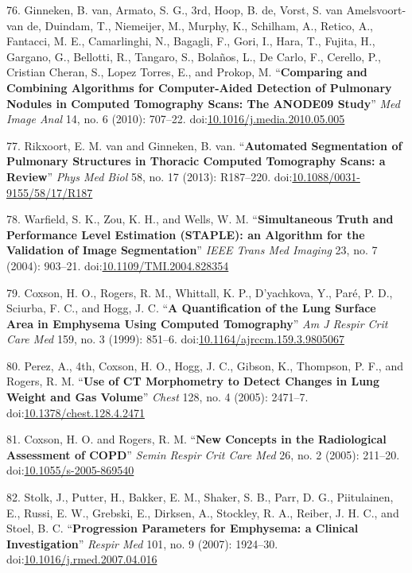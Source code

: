 \documentclass[11pt,]{article}
\begin{document}
76. Ginneken, B. van, Armato, S. G., 3rd, Hoop, B. de, Vorst, S. van
Amelsvoort-van de, Duindam, T., Niemeijer, M., Murphy, K., Schilham, A.,
Retico, A., Fantacci, M. E., Camarlinghi, N., Bagagli, F., Gori, I.,
Hara, T., Fujita, H., Gargano, G., Bellotti, R., Tangaro, S., Bola{ñ}os,
L., De Carlo, F., Cerello, P., Cristian Cheran, S., Lopez Torres, E.,
and Prokop, M. ``\textbf{Comparing and Combining Algorithms for
Computer-Aided Detection of Pulmonary Nodules in Computed Tomography
Scans: The ANODE09 Study}'' \emph{Med Image Anal} 14, no. 6 (2010):
707--22.
doi:\href{http://dx.doi.org/10.1016/j.media.2010.05.005}{10.1016/j.media.2010.05.005}

77. Rikxoort, E. M. van and Ginneken, B. van. ``\textbf{Automated
Segmentation of Pulmonary Structures in Thoracic Computed Tomography
Scans: a Review}'' \emph{Phys Med Biol} 58, no. 17 (2013): R187--220.
doi:\href{http://dx.doi.org/10.1088/0031-9155/58/17/R187}{10.1088/0031-9155/58/17/R187}

78. Warfield, S. K., Zou, K. H., and Wells, W. M. ``\textbf{Simultaneous
Truth and Performance Level Estimation (STAPLE): an Algorithm for the
Validation of Image Segmentation}'' \emph{IEEE Trans Med Imaging} 23,
no. 7 (2004): 903--21.
doi:\href{http://dx.doi.org/10.1109/TMI.2004.828354}{10.1109/TMI.2004.828354}

79. Coxson, H. O., Rogers, R. M., Whittall, K. P., D'yachkova, Y.,
Par{é}, P. D., Sciurba, F. C., and Hogg, J. C. ``\textbf{A
Quantification of the Lung Surface Area in Emphysema Using Computed
Tomography}'' \emph{Am J Respir Crit Care Med} 159, no. 3 (1999):
851--6.
doi:\href{http://dx.doi.org/10.1164/ajrccm.159.3.9805067}{10.1164/ajrccm.159.3.9805067}

80. Perez, A., 4th, Coxson, H. O., Hogg, J. C., Gibson, K., Thompson, P.
F., and Rogers, R. M. ``\textbf{Use of CT Morphometry to Detect Changes
in Lung Weight and Gas Volume}'' \emph{Chest} 128, no. 4 (2005):
2471--7.
doi:\href{http://dx.doi.org/10.1378/chest.128.4.2471}{10.1378/chest.128.4.2471}

81. Coxson, H. O. and Rogers, R. M. ``\textbf{New Concepts in the
Radiological Assessment of COPD}'' \emph{Semin Respir Crit Care Med} 26,
no. 2 (2005): 211--20.
doi:\href{http://dx.doi.org/10.1055/s-2005-869540}{10.1055/s-2005-869540}

82. Stolk, J., Putter, H., Bakker, E. M., Shaker, S. B., Parr, D. G.,
Piitulainen, E., Russi, E. W., Grebski, E., Dirksen, A., Stockley, R.
A., Reiber, J. H. C., and Stoel, B. C. ``\textbf{Progression Parameters
for Emphysema: a Clinical Investigation}'' \emph{Respir Med} 101, no. 9
(2007): 1924--30.
doi:\href{http://dx.doi.org/10.1016/j.rmed.2007.04.016}{10.1016/j.rmed.2007.04.016}
\end{document}
